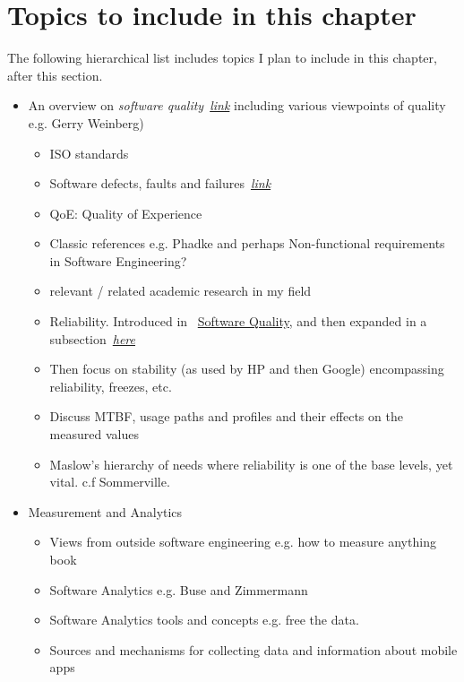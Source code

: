 
\section{Topics to include in this chapter}
The following hierarchical list includes topics I plan to include in this chapter, after this section.


\begin{itemize}
    \item An overview on \emph{software quality}~\hyperlink{software.quality}{\emph{link}}
including various viewpoints of quality e.g. Gerry Weinberg)
    \begin{itemize} 
        \item ISO standards
        \item Software defects, faults and failures~\hyperlink{defects.faults.failures}{\emph{link}}
        \item QoE: Quality of Experience
        \item Classic references e.g. Phadke and perhaps Non-functional requirements in Software Engineering? 
        \item relevant / related academic research in my field
        \item Reliability. Introduced in ~\hyperlink{software.quality}{Software Quality}, and then expanded in a subsection~\hyperlink{software.reliability}{\emph{here}}
        \item Then focus on stability (as used by HP and then Google) encompassing reliability, freezes, etc.
        \item Discuss MTBF, usage paths and profiles and their effects on the measured values
        \item Maslow's hierarchy of needs where reliability is one of the base levels, yet vital. c.f Sommerville.
    \end{itemize}
    \item Measurement and Analytics
    \begin{itemize}
        \item Views from outside software engineering e.g. how to measure anything book
        \item Software Analytics e.g. Buse and Zimmermann
        \item Software Analytics tools and concepts e.g. free the data.
        \item Sources and mechanisms for collecting data and information about mobile apps

\end{itemize}
\end{itemize}

